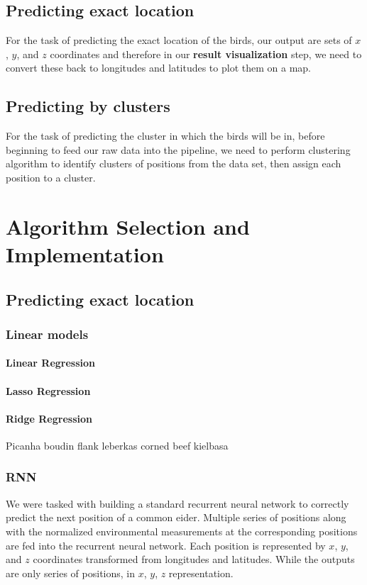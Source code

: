 \documentclass[10pt,conference]{IEEEtran}
\begin{document}
\subsection{Predicting exact location}
    For the task of predicting the exact location of the birds, our output are sets of $x$, $y$, and $z$ coordinates and therefore in our \textbf{result visualization} step, we need to convert these back to longitudes and latitudes to plot them on a map.
\subsection{Predicting by clusters}
    For the task of predicting the cluster in which the birds will be in, before beginning to feed our raw data into the pipeline, we need to perform clustering algorithm to identify clusters of positions from the data set, then assign each position to a cluster.

\section{Algorithm Selection and Implementation}
\subsection{Predicting exact location}
\subsubsection{Linear models}
\paragraph{Linear Regression}
\paragraph{Lasso Regression}
\paragraph{Ridge Regression}
    Picanha boudin flank leberkas corned beef kielbasa 
    
\subsubsection{RNN}
We were tasked with building a standard recurrent neural network to correctly predict the next position of a common eider. Multiple series of positions along with the normalized environmental measurements at the corresponding positions are fed into the recurrent neural network. Each position is represented by $x$, $y$, and $z$ coordinates transformed from longitudes and latitudes. While the outputs are only series of positions, in $x$, $y$, $z$ representation.
\end{document}
